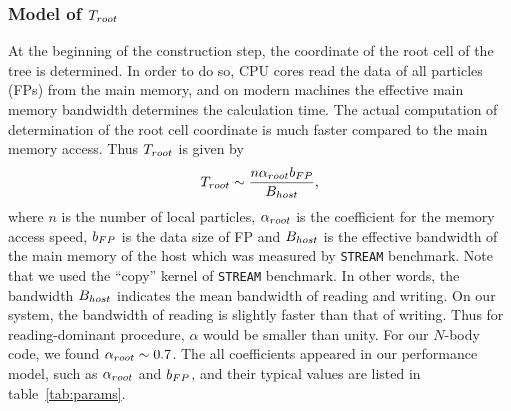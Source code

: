 \documentclass[dvipdfmx]{pasj01}
\begin{document}
\subsubsection{Model of $T_{\rm root}$}

At the beginning of the construction step, the coordinate of the root
cell of the tree is determined. In order to do so, CPU cores read the
data of all particles (FPs) from the main memory, and on modern
machines the effective main memory bandwidth determines the
calculation time. The actual computation of determination of the root
cell coordinate is much faster compared to the main memory access.
Thus $T_{\rm root}$ is given by
\begin{equation}
  T_{\rm root} \sim \frac{n \alpha_{\rm root} b_{\rm FP}}{B_{\rm host}},
  \label{eq:model_root_cell}
\end{equation}
where $n$ is the number of local particles, $\alpha_{\rm root}$ is the
coefficient for the memory access speed, $b_{\rm FP}$ is the data size
of FP and $B_{\rm host}$ is the effective bandwidth of the main memory
of the host which was measured by {\tt STREAM} benchmark. Note that we
used the ``copy'' kernel of {\tt STREAM} benchmark. In other words,
the bandwidth $B_{\rm host}$ indicates the mean bandwidth of reading
and writing. On our system, the bandwidth of reading is slightly
faster than that of writing. Thus for reading-dominant procedure,
$\alpha$ would be smaller than unity. For our $N$-body code, we found
$\alpha_{\rm root} \sim 0.7$. The all coefficients appeared in our
performance model, such as $\alpha_{\rm root}$ and $b_{\rm FP}$, and
their typical values are listed in table~\ref{tab:params}.
\end{document}
